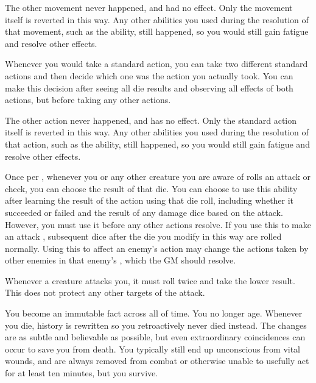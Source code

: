       The other movement never happened, and had no effect.
      Only the movement itself is reverted in this way.
      Any other abilities you used during the resolution of that movement, such as the  ability, still happened, so you would still gain fatigue and resolve other effects.

       Whenever you would take a standard action, you can take two different standard actions and then decide which one was the action you actually took.
      You can make this decision after seeing all die results and observing all effects of both actions, but before taking any other actions.

      The other action never happened, and has no effect.
      Only the standard action itself is reverted in this way.
      Any other abilities you used during the resolution of that action, such as the  ability, still happened, so you would still gain fatigue and resolve other effects.

       Once per , whenever you or any other creature you are aware of rolls an attack or check, you can choose the result of that die.
      You can choose to use this ability after learning the result of the action using that die roll, including whether it succeeded or failed and the result of any damage dice based on the attack.
      However, you must use it before any other actions resolve.
      If you use this to make an attack , subsequent dice after the die you modify in this way are rolled normally.
      Using this to affect an enemy's action may change the actions taken by other enemies in that enemy's , which the GM should resolve.

       Whenever a creature attacks you, it must roll twice and take the lower result.
      This does not protect any other targets of the attack.

       You become an immutable fact across all of time.
      You no longer age.
      Whenever you die, history is rewritten so you retroactively never died instead.
      The changes are as subtle and believable as possible, but even extraordinary coincidences can occur to save you from death.
      You typically still end up unconscious from vital wounds, and are always removed from combat or otherwise unable to usefully act for at least ten minutes, but you survive.

